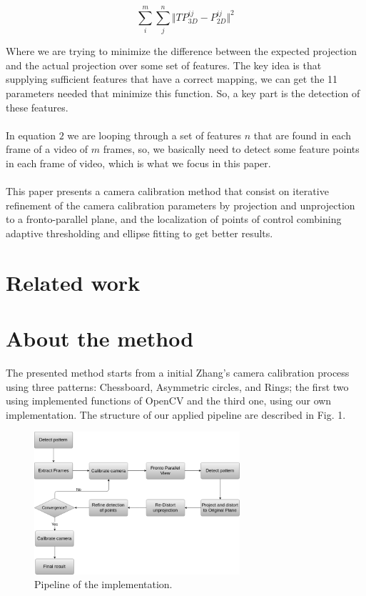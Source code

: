 \documentclass[journal]{IEEEtran}
\begin{document}
\begin{equation}
  \sum^{m}_{i} \sum^{n}_{j} \Vert TP^{ij}_{3D} - P^{ij}_{2D} \Vert^{2}
\end{equation}

Where we are trying to minimize the difference between the expected projection and the actual projection over some set of features. The key idea is that supplying sufficient features that have a correct mapping, we can get the 11 parameters needed that minimize this function. So, a key part is the detection of these features.
\\
\\
In equation $2$ we are looping through a set of features $n$ that are found in each frame of a video of $m$ frames, so, we basically need to detect some feature points in each frame of video, which is what we focus in this paper.
\\
\\
This paper presents a camera calibration method that consist on iterative refinement of the camera calibration parameters by projection and unprojection to a fronto-parallel plane, and the localization of points of control combining adaptive thresholding and ellipse fitting to get better results.

\section{Related work}


\section{About the method}
The presented method starts from a initial Zhang's camera calibration process using three patterns: Chessboard, Asymmetric circles, and Rings; the first two using implemented functions of OpenCV and the third one, using our own implementation. The structure of our applied pipeline are described in Fig. 1.

\begin{figure}[H]
\centering
\includegraphics[width=3.0in]{_img/img_report4_pipeline.png}
\caption{Pipeline of the implementation.}
\end{figure}
\end{document}
